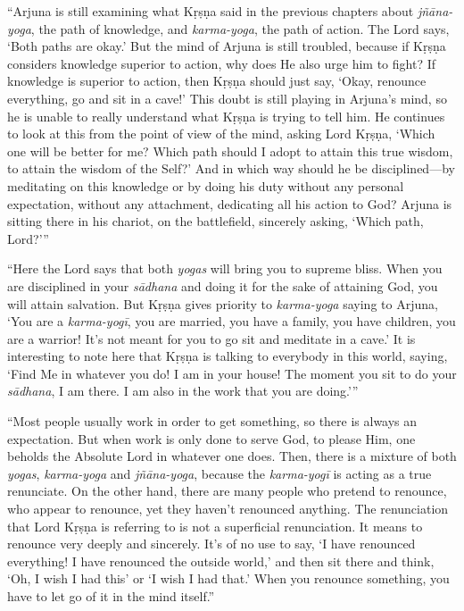 \enquote{Arjuna is still examining what Kṛṣṇa said in the previous chapters about \textit{jñāna-yoga}, the path of knowledge, and \textit{karma-yoga}, the path of action. The Lord says, \enquote{Both paths are okay.} But the mind of Arjuna is still troubled, because if Kṛṣṇa considers knowledge superior to action, why does He also urge him to fight? If knowledge is superior to action, then Kṛṣṇa should just say, \enquote{Okay, renounce everything, go and sit in a cave!} This doubt is still playing in Arjuna’s mind, so he is unable to really understand what Kṛṣṇa is trying to tell him. He continues to look at this from the point of view of the mind, asking Lord Kṛṣṇa, \enquote{Which one will be better for me? Which path should I adopt to attain this true wisdom, to attain the wisdom of the Self?} And in which way should he be disciplined---by meditating on this knowledge or by doing his duty without any personal expectation, without any attachment, dedicating all his action to God? Arjuna is sitting there in his chariot, on the battlefield, sincerely asking, \enquote{Which path, Lord?}}

\enquote{Here the Lord says that both \textit{yogas} will bring you to supreme bliss. When you are disciplined in your \textit{sādhana} and doing it for the sake of attaining God, you will attain salvation. But Kṛṣṇa gives priority to \textit{karma-yoga} saying to Arjuna, \enquote{You are a \textit{karma-yogī}, you are married, you have a family, you have children, you are a warrior! It’s not meant for you to go sit and meditate in a cave.} It is interesting to note here that Kṛṣṇa is talking to everybody in this world, saying, \enquote{Find Me in whatever you do! I am in your house! The moment you sit to do your \textit{sādhana}, I am there. I am also in the work that you are doing.}}

\enquote{Most people usually work in order to get something, so there is always an expectation. But when work is only done to serve God, to please Him, one beholds the Absolute Lord in whatever one does. Then, there is a mixture of both \textit{yogas}, \textit{karma-yoga} and \textit{jñāna-yoga}, because the \textit{karma-yogī} is acting as a true renunciate. On the other hand, there are many people who pretend to renounce, who appear to renounce, yet they haven’t renounced anything. The renunciation that Lord Kṛṣṇa is referring to is not a superficial renunciation. It means to renounce very deeply and sincerely. It’s of no use to say, \enquote{I have renounced everything! I have renounced the outside world,} and then sit there and think, \enquote{Oh, I wish I had this} or \enquote{I wish I had that.} When you renounce something, you have to let go of it in the mind itself.}

